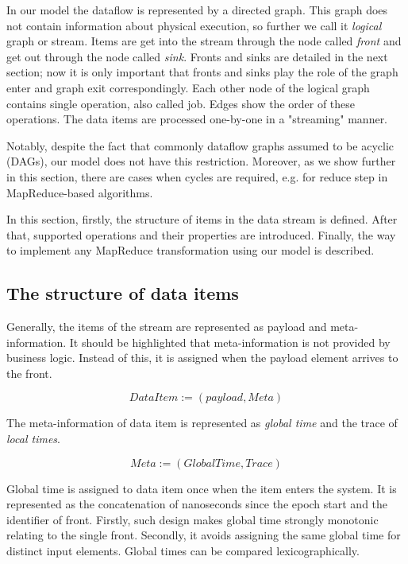 
\label {fs-model-section}
In our model the dataflow is represented by a directed graph. This graph does not contain information about physical execution, so further we call it {\it logical} graph or stream. Items are get into the stream through the node called {\it front} and get out through the node called {\it sink}. Fronts and sinks are detailed in the next section; now it is only important that fronts and sinks play the role of the graph enter and graph exit correspondingly. Each other node of the logical graph contains single operation, also called job. Edges show the order of these operations. The data items are processed one-by-one in a "streaming" manner. 

Notably, despite the fact that commonly dataflow graphs assumed to be acyclic (DAGs), our model does not have this restriction. Moreover, as we show further in this section, there are cases when cycles are required, e.g. for reduce step in MapReduce-based algorithms. 

In this section, firstly, the structure of items in the data stream is defined. After that, supported operations and their properties are introduced. Finally, the way to implement any MapReduce transformation using our model is described.

\subsection{The structure of data items}
Generally, the items of the stream are represented as payload and meta-information. It should be highlighted that meta-information is not provided by business logic. Instead of this, it is assigned when the payload element arrives to the front. 

\[DataItem := (payload, Meta)\]

The meta-information of data item is represented as {\it global time} and the trace of {\it local times}.

\[Meta := (GlobalTime, Trace)\]

Global time is assigned to data item once when the item enters the system. It is represented as the concatenation of nanoseconds since the epoch start and the identifier of front. Firstly, such design makes global time strongly monotonic relating to the single front. Secondly, it avoids assigning the same global time for distinct input elements. Global times can be compared lexicographically.

